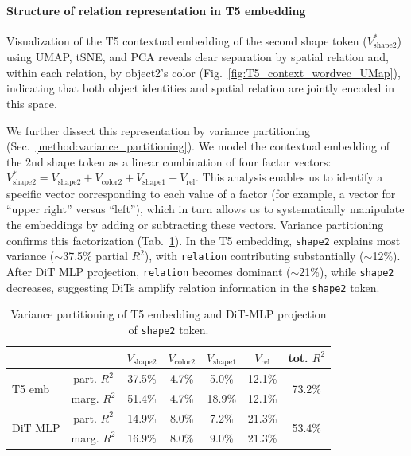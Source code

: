 \paragraph{Structure of relation representation in T5 embedding}
Visualization of the T5 contextual embedding of the second shape token ($V^*_{\text{shape2}}$) using UMAP, tSNE, and PCA reveals clear separation by spatial relation and, within each relation, by object2's color (Fig.~\ref{fig:T5_context_wordvec_UMap}), indicating that both object identities and spatial relation are jointly encoded in this space.

We further dissect this representation by variance partitioning (Sec.~\ref{method:variance_partitioning}). We model the contextual embedding of the 2nd shape token as a linear combination of four factor vectors:
$V^*_{\text{shape2}}=V_{\text{shape2}}+V_{\text{color2}}+V_{\text{shape1}}+V_{\text{rel}}$.
This analysis enables us to identify a specific vector corresponding to each value of a factor (for example, a vector for ``upper right'' versus ``left''), which in turn allows us to systematically manipulate the embeddings by adding or subtracting these vectors.
Variance partitioning confirms this factorization (Tab.~\ref{tab:varpart_shape2}).
In the T5 embedding, \texttt{shape2} explains most variance ($\sim$37.5\% partial $R^2$), with \texttt{relation} contributing substantially ($\sim$12\%). After DiT MLP projection, \texttt{relation} becomes dominant ($\sim$21\%), while \texttt{shape2} decreases, suggesting DiTs amplify relation information in the \texttt{shape2} token.

\begin{table}[!h]
\centering
\scriptsize
\renewcommand{\arraystretch}{0.9}
\begin{tabular}{lcccccc}
\toprule
  & & $V_{\text{shape2}}$ & $V_{\text{color2}}$ & $V_{\text{shape1}}$ & $V_{\text{rel}}$ & tot. $R^2$ \\
\midrule
\multirow{2}{*}{T5 emb}
 & part. $R^2$ & 37.5\% & 4.7\% & 5.0\% & 12.1\% & \multirow{2}{*}{73.2\%} \\
 & marg. $R^2$ & 51.4\% & 4.7\% & 18.9\% & 12.1\% &  \\
\midrule
\multirow{2}{*}{DiT MLP}
 & part. $R^2$ & 14.9\% & 8.0\% & 7.2\% & 21.3\% & \multirow{2}{*}{53.4\%} \\
 & marg. $R^2$ & 16.9\% & 8.0\% & 9.0\% & 21.3\% &  \\
\bottomrule
\end{tabular}
\caption{Variance partitioning of T5 embedding and DiT-MLP projection of \texttt{shape2} token.}\label{tab:varpart_shape2}
\vspace{-7pt}
\end{table}


